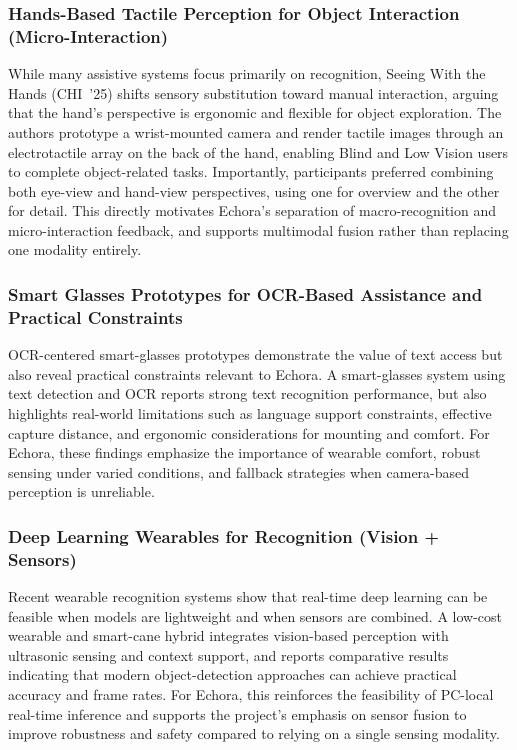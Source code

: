 \subsubsection{Hands-Based Tactile Perception for Object Interaction (Micro-Interaction)}
\label{subsec:lit_hands}

While many assistive systems focus primarily on recognition, Seeing With the Hands (CHI~’25) shifts sensory substitution toward manual interaction, arguing that the hand’s perspective is ergonomic and flexible for object exploration. The authors prototype a wrist-mounted camera and render tactile images through an electrotactile array on the back of the hand, enabling Blind and Low Vision users to complete object-related tasks. Importantly, participants preferred combining both eye-view and hand-view perspectives, using one for overview and the other for detail. This directly motivates Echora’s separation of macro-recognition and micro-interaction feedback, and supports multimodal fusion rather than replacing one modality entirely.

\subsubsection{Smart Glasses Prototypes for OCR-Based Assistance and Practical Constraints}
\label{subsec:lit_ocr_glasses}

OCR-centered smart-glasses prototypes demonstrate the value of text access but also reveal practical constraints relevant to Echora. A smart-glasses system using text detection and OCR reports strong text recognition performance, but also highlights real-world limitations such as language support constraints, effective capture distance, and ergonomic considerations for mounting and comfort. For Echora, these findings emphasize the importance of wearable comfort, robust sensing under varied conditions, and fallback strategies when camera-based perception is unreliable.

\subsubsection{Deep Learning Wearables for Recognition (Vision + Sensors)}
\label{subsec:lit_dl_wearables}

Recent wearable recognition systems show that real-time deep learning can be feasible when models are lightweight and when sensors are combined. A low-cost wearable and smart-cane hybrid integrates vision-based perception with ultrasonic sensing and context support, and reports comparative results indicating that modern object-detection approaches can achieve practical accuracy and frame rates. For Echora, this reinforces the feasibility of PC-local real-time inference and supports the project’s emphasis on sensor fusion to improve robustness and safety compared to relying on a single sensing modality.

